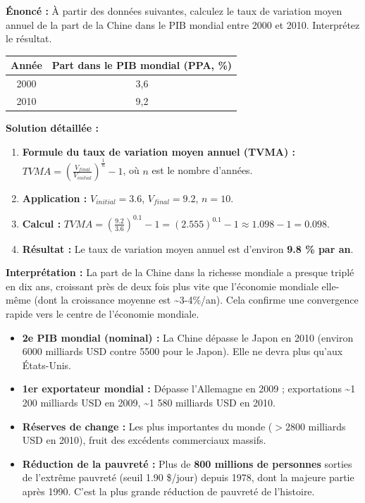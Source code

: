 \documentclass[11pt]{article}
\begin{document}
\begin{exoresolu}
\textbf{Énoncé :} À partir des données suivantes, calculez le taux de variation moyen annuel de la part de la Chine dans le PIB mondial entre 2000 et 2010. Interprétez le résultat.
\begin{center}
\begin{tabular}{|c|c|}\hline
Année & Part dans le PIB mondial (PPA, \%) \\ \hline
2000 & 3,6 \\ \hline
2010 & 9,2 \\ \hline
\end{tabular}
\end{center}

\tcblower
\textbf{Solution détaillée :}
\begin{enumerate}
    \item \textbf{Formule du taux de variation moyen annuel (TVMA) :} $TVMA = \left( \frac{V_{final}}{V_{initial}} \right)^{\frac{1}{n}} - 1$, où $n$ est le nombre d'années.
    \item \textbf{Application :} $V_{initial} = \num{3,6}$, $V_{final} = \num{9,2}$, $n = 10$.
    \item \textbf{Calcul :} $TVMA = \left( \frac{\num{9,2}}{\num{3,6}} \right)^{\num{0,1}} - 1 = (\num{2,555})^{\num{0,1}} - 1 \approx \num{1,098} - 1 = \num{0,098}$.
    \item \textbf{Résultat :} Le taux de variation moyen annuel est d'environ \textbf{\num{9,8} \% par an}.
\end{enumerate}
\textbf{Interprétation :} La part de la Chine dans la richesse mondiale a presque triplé en dix ans, croissant près de deux fois plus vite que l'économie mondiale elle-même (dont la croissance moyenne est \num{~3-4}\%/an). Cela confirme une convergence rapide vers le centre de l'économie mondiale.
\end{exoresolu}

\begin{aretenir}
\begin{itemize}
    \item \textbf{2e PIB mondial (nominal) :} La Chine dépasse le Japon en 2010 (environ \num{6 000} milliards USD contre \num{5 500} pour le Japon). Elle ne devra plus qu'aux États-Unis.
    \item \textbf{1er exportateur mondial :} Dépasse l'Allemagne en 2009 ; exportations \num{~1 200} milliards USD en 2009, \num{~1 580} milliards USD en 2010.
    \item \textbf{Réserves de change :} Les plus importantes du monde ($> \num{2 800}$ milliards USD en 2010), fruit des excédents commerciaux massifs.
    \item \textbf{Réduction de la pauvreté :} Plus de \textbf{800 millions de personnes} sorties de l'extrême pauvreté (seuil \num{1,90} \$/jour) depuis 1978, dont la majeure partie après 1990. C'est la plus grande réduction de pauvreté de l'histoire.
\end{itemize}
\end{aretenir}
\end{document}

